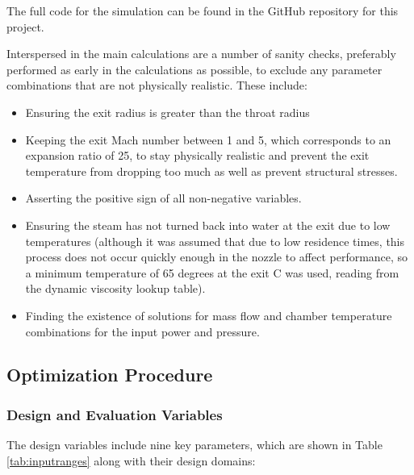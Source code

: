 \documentclass{homework}
\begin{document}
\begin{multicols}{2}
  
  The full code for the simulation can be found in the GitHub repository for this project.  
  
  Interspersed in the main calculations are a number of sanity checks, preferably performed as early in the calculations as possible, to exclude any parameter combinations that are not physically realistic. These include:  
  
\begin{itemize}
\item Ensuring the exit radius is greater than the throat radius
  \item Keeping the exit Mach number between 1 and 5, which corresponds to an expansion ratio of 25, to stay physically realistic and prevent the exit temperature from dropping too much as well as prevent structural stresses.
  \item Asserting the positive sign of all non-negative variables.
  \item Ensuring the steam has not turned back into water at the exit due to low temperatures (although it was assumed that due to low residence times, this process does not occur quickly enough in the nozzle to affect performance, so a minimum temperature of 65 degrees at the exit C was used, reading from the dynamic viscosity lookup table).
  \item Finding the existence of solutions for mass flow and chamber temperature combinations for the input power and pressure.
\end{itemize}
  
\subsection{Optimization Procedure}

\subsubsection{Design and Evaluation Variables}
	  The design variables include nine key parameters, which are shown in Table \ref{tab:inputranges} along with their design domains:


\end{multicols}
\end{document}
